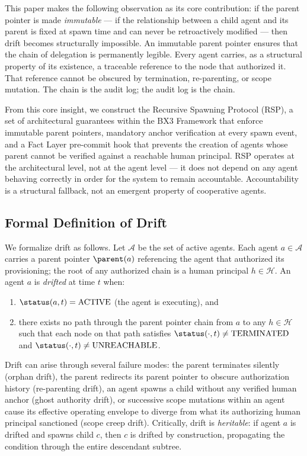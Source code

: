 This paper makes the following observation as its core contribution: if the parent pointer is made \textit{immutable} — if the relationship between a child agent and its parent is fixed at spawn time and can never be retroactively modified — then drift becomes structurally impossible. An immutable parent pointer ensures that the chain of delegation is permanently legible. Every agent carries, as a structural property of its existence, a traceable reference to the node that authorized it. That reference cannot be obscured by termination, re-parenting, or scope mutation. The chain is the audit log; the audit log is the chain.

From this core insight, we construct the Recursive Spawning Protocol (RSP), a set of architectural guarantees within the BX3 Framework that enforce immutable parent pointers, mandatory anchor verification at every spawn event, and a Fact Layer pre-commit hook that prevents the creation of agents whose parent cannot be verified against a reachable human principal. RSP operates at the architectural level, not at the agent level — it does not depend on any agent behaving correctly in order for the system to remain accountable. Accountability is a structural fallback, not an emergent property of cooperative agents.

\subsection{Formal Definition of Drift}

We formalize drift as follows. Let $\mathcal{A}$ be the set of active agents. Each agent $a \in \mathcal{A}$ carries a parent pointer $\parent(a)$ referencing the agent that authorized its provisioning; the root of any authorized chain is a human principal $h \in \mathcal{H}$. An agent $a$ is \textit{drifted} at time $t$ when:

\begin{enumerate}
    \item $\status(a, t) = \text{ACTIVE}$ (the agent is executing), and
    \item there exists no path through the parent pointer chain from $a$ to any $h \in \mathcal{H}$ such that each node on that path satisfies $\status(\cdot, t) \neq \text{TERMINATED}$ and $\status(\cdot, t) \neq \text{UNREACHABLE}$.
\end{enumerate}

Drift can arise through several failure modes: the parent terminates silently (orphan drift), the parent redirects its parent pointer to obscure authorization history (re-parenting drift), an agent spawns a child without any verified human anchor (ghost authority drift), or successive scope mutations within an agent cause its effective operating envelope to diverge from what its authorizing human principal sanctioned (scope creep drift). Critically, drift is \textit{heritable}: if agent $a$ is drifted and spawns child $c$, then $c$ is drifted by construction, propagating the condition through the entire descendant subtree.

